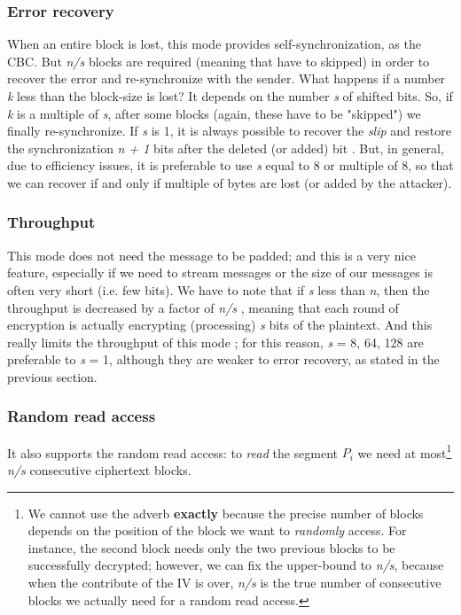 \documentclass[11 pt]{article}
\begin{document}
\subsubsection{Error recovery}
When an entire block is lost, this mode provides self-synchronization, as the CBC. But \textit{n/s} blocks are required (meaning that have to skipped) in order to recover the error and re-synchronize with the sender.
What happens if a number \textit{k} less than the block-size is lost? It depends on the number \textit{s} of shifted bits. So, if \textit{k} is a multiple of \textit{s}, after some blocks (again, these have to be "skipped") we finally re-synchronize. If \textit{s} is 1, it is always possible to recover the \textit{slip} and restore the synchronization \textit{n + 1} bits after the deleted (or added) bit \cite{NIST mop}. But, in general, due to efficiency issues, it is preferable to use \textit{s} equal to 8 or multiple of 8, so that we can recover if and only if multiple of bytes are lost (or added by the attacker).
\subsubsection{Throughput}
This mode does not need the message to be padded; and this is a very nice feature, especially if we need to stream messages or the size of our messages is often very short (i.e. few bits). 
We have to note that if \textit{s} less than \textit{n}, then the throughput is decreased by a factor of \textit{n/s} \cite{Crypto Book}, meaning that each round of encryption is actually encrypting (processing) \textit{s} bits of the plaintext. And this really limits the throughput of this mode \cite{Performance comparison}; for this reason, \textit{s} = 8, 64, 128 are preferable to \textit{s} = 1, although they are weaker to error recovery, as stated in the previous section. %
\subsubsection{Random read access}
It also supports the random read access: to \textit{read} the segment $P_i$ we need at most\footnote{We cannot use the adverb \textbf{exactly} because the precise number of blocks depends on the position of the block we want to \textit{randomly} access. For instance, the second block needs only the two previous blocks to be successfully decrypted; however, we can fix the upper-bound to \textit{n/s}, because when the contribute of the IV is over, \textit{n/s} is the true number of consecutive blocks we actually need for a random read access.} \textit{n/s} consecutive ciphertext blocks.
\end{document}

